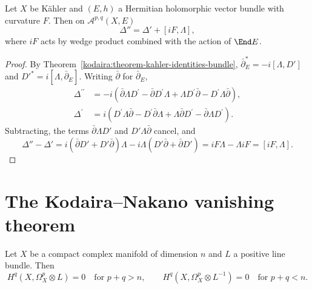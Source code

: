 \begin{theorem}\label{kodaira:theorem-nakano-identity}
Let $X$ be K\"ahler and $(E, h)$ a Hermitian holomorphic vector bundle with curvature $F$. Then on $\mathcal{A}^{p,q}(X, E)$
\[
\Delta'' = \Delta' + [iF, \Lambda],
\]
where $iF$ acts by wedge product combined with the action of $\End E$.
\end{theorem}

\begin{proof}
By Theorem~\ref{kodaira:theorem-kahler-identities-bundle}, $\bar\partial_E^* = -i[\Lambda, D']$ and $D'^* = i[\Lambda, \bar\partial_E]$. Writing
$\bar\partial$ for $\bar\partial_E$,
\[
\begin{aligned}
\Delta^{\prime\prime} &= -i\left(\bar\partial\Lambda D^{\prime} - \bar\partial D^{\prime}\Lambda + \Lambda D^{\prime}\bar\partial - D^{\prime}\Lambda\bar\partial\right), \\
\Delta^{\prime} &= i\left(D^{\prime}\Lambda\bar\partial - D^{\prime}\bar\partial\Lambda + \Lambda\bar\partial D^{\prime} - \bar\partial\Lambda D^{\prime}\right).
\end{aligned}
\]
Subtracting, the terms $\bar\partial\Lambda D'$ and $D'\Lambda\bar\partial$ cancel, and
\[
\Delta'' - \Delta' = i(\bar\partial D' + D'\bar\partial)\Lambda - i\Lambda(D'\bar\partial + \bar\partial D') = iF\Lambda - \Lambda iF = [iF, \Lambda] .
\]
\end{proof}

\section{The Kodaira--Nakano vanishing theorem}\label{kodaira:section-vanishing}

\begin{theorem}\label{kodaira:theorem-kodaira-nakano}
Let $X$ be a compact complex manifold of dimension $n$ and $L$ a positive line bundle. Then
\[
H^q(X, \Omega^p_X \otimes L) = 0 \quad \text{for } p + q > n, \qquad H^q(X, \Omega^p_X \otimes L^{-1}) = 0 \quad \text{for } p + q < n .
\]
\end{theorem}

